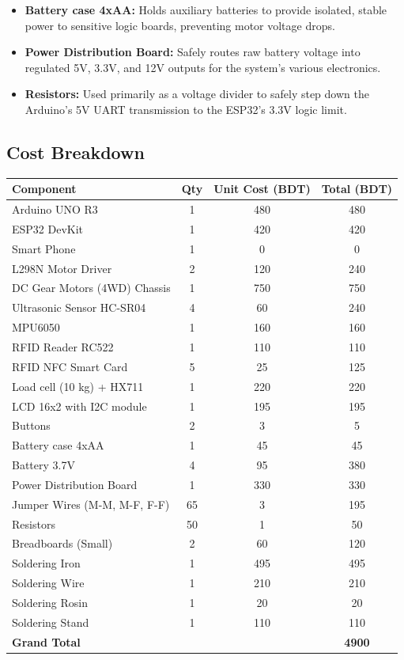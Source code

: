 \documentclass[12pt,a4paper]{article}
\begin{document}
\begin{itemize}
    \item \textbf{Battery case 4xAA:} Holds auxiliary batteries to provide isolated, stable power to sensitive logic boards, preventing motor voltage drops.
    \item \textbf{Power Distribution Board:} Safely routes raw battery voltage into regulated 5V, 3.3V, and 12V outputs for the system's various electronics.
    \item \textbf{Resistors:} Used primarily as a voltage divider to safely step down the Arduino's 5V UART transmission to the ESP32's 3.3V logic limit.
\end{itemize}


\subsection{Cost Breakdown}
\begin{table}[h!]
    \centering
    \begin{tabular}{|l|c|c|c|}
        \hline
        \textbf{Component} & \textbf{Qty} & \textbf{Unit Cost (BDT)} & \textbf{Total (BDT)} \\
        \hline
        Arduino UNO R3 & 1 & 480 & 480 \\
        ESP32 DevKit & 1 & 420 & 420 \\
        Smart Phone & 1 & 0 & 0 \\
        L298N Motor Driver & 2 & 120 & 240 \\
        DC Gear Motors (4WD) Chassis & 1 & 750 & 750 \\
        Ultrasonic Sensor HC-SR04 & 4 & 60 & 240 \\
        MPU6050 & 1 & 160 & 160 \\
        RFID Reader RC522 & 1 & 110 & 110 \\
        RFID NFC Smart Card & 5 & 25 & 125 \\
        Load cell (10 kg) + HX711 & 1 & 220 & 220 \\
        LCD 16x2 with I2C module & 1 & 195 & 195 \\
        Buttons & 2 & 3 & 5 \\
        Battery case 4xAA & 1 & 45 & 45 \\
        Battery 3.7V & 4 & 95 & 380 \\
        Power Distribution Board & 1 & 330 & 330 \\
        Jumper Wires (M-M, M-F, F-F) & 65 & 3 & 195 \\
        Resistors & 50 & 1 & 50 \\
        Breadboards (Small) & 2 & 60 & 120 \\
        Soldering Iron & 1 & 495 & 495 \\
        Soldering Wire & 1 & 210 & 210 \\
        Soldering Rosin & 1 & 20 & 20 \\
        Soldering Stand & 1 & 110 & 110 \\
        \hline
        \textbf{Grand Total} & & & \textbf{4900} \\
        \hline
    \end{tabular}
\end{table}
\end{document}

